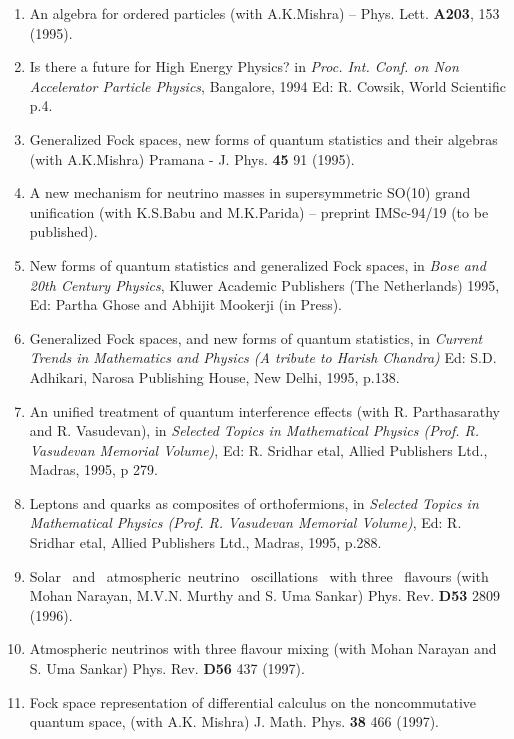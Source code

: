 \begin{enumerate}
\item An algebra for ordered particles (with A.K.Mishra) --
Phys. Lett. {\bf A203}, 153 (1995).

\item Is there a future for High Energy Physics? in {\it Proc. Int.
Conf. on Non Accelerator Particle Physics}, Bangalore, 1994 Ed: R.
Cowsik, World Scientific p.4.

\item Generalized Fock spaces, new forms of quantum statistics and
their algebras (with A.K.Mishra) Pramana - J. Phys. {\bf 45} 91 (1995).

\item A new mechanism for neutrino masses in supersymmetric SO(10)
grand unification (with K.S.Babu and M.K.Parida) -- preprint IMSc-94/19
(to be published).

\item New forms of quantum statistics and generalized Fock spa\-ces, 
in {\it Bose and 20th Century Physics}, Kluwer Academic Publishers (The
Netherlands) 1995, Ed: Partha Ghose and Abhijit Mookerji (in Press).

\item Generalized Fock spaces, and new forms of quantum stati\-stics, in {\it Current Trends  in Mathematics and Physics (A tribute to Harish Chandra)} Ed: S.D. Adhikari, Narosa Publishing House, New Delhi, 1995, p.138.

\item An unified treatment of quantum interference effects (with R.
Parthasarathy and R. Vasudevan), in {\it Selected Topics in Mathematical
Physics (Prof. R. Vasudevan Memorial Volume)}, Ed: R. Sridhar etal, 
Allied Publishers Ltd., Madras, 1995, p 279.

\item Leptons and quarks as composites of orthofermions, in {\it
Selected Topics in Mathematical Physics (Prof. R. Vasudevan Me\-morial
Volume)}, Ed: R. Sridhar etal, Allied Publishers Ltd., Madras, 1995, 
p.288.

\item Solar \ and \ atmospheric\ neutrino \ oscillations \ with
three \ flavours (with Mohan Narayan, M.V.N. Murthy and S. Uma Sankar)
Phys. Rev. {\bf D53} 2809 (1996).

\item Atmospheric neutrinos with three flavour mixing (with Mohan
Narayan and S. Uma Sankar) Phys. Rev. {\bf D56} 437 (1997).

\item Fock space representation of differential calculus on the
noncommutative quantum space, (with A.K. Mishra) 
J. Ma\-th. Phys. {\bf 38} 466 (1997).


\end{enumerate}
